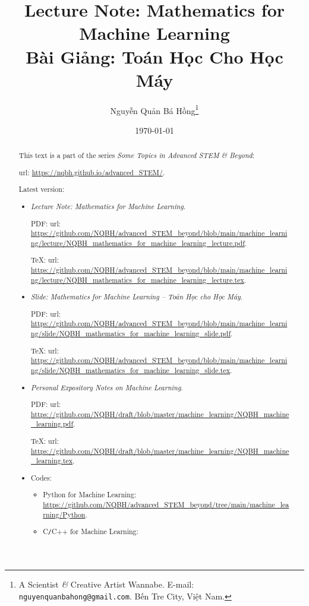\documentclass{article}
\title{Lecture Note: Mathematics for Machine Learning\\Bài Giảng: Toán Học Cho Học Máy}
\author{Nguyễn Quản Bá Hồng\footnote{A Scientist {\it\&} Creative Artist Wannabe. E-mail: {\tt nguyenquanbahong@gmail.com}. Bến Tre City, Việt Nam.}}
\date{\today}
\begin{document}
\maketitle
\begin{abstract}
	This text is a part of the series {\it Some Topics in Advanced STEM \& Beyond}:
	
	{\sc url}: \url{https://nqbh.github.io/advanced_STEM/}.
	
	Latest version:
	\begin{itemize}
		\item {\it Lecture Note: Mathematics for Machine Learning}.
		
		PDF: {\sc url}: \url{https://github.com/NQBH/advanced_STEM_beyond/blob/main/machine_learning/lecture/NQBH_mathematics_for_machine_learning_lecture.pdf}.
		
		\TeX: {\sc url}: \url{https://github.com/NQBH/advanced_STEM_beyond/blob/main/machine_learning/lecture/NQBH_mathematics_for_machine_learning_lecture.tex}.
		\item {\it Slide: Mathematics for Machine Learning -- Toán Học cho Học Máy}.
		
		PDF: {\sc url}: \url{https://github.com/NQBH/advanced_STEM_beyond/blob/main/machine_learning/slide/NQBH_mathematics_for_machine_learning_slide.pdf}.
		
		\TeX: {\sc url}: \url{https://github.com/NQBH/advanced_STEM_beyond/blob/main/machine_learning/slide/NQBH_mathematics_for_machine_learning_slide.tex}.
		\item {\it Personal Expository Notes on Machine Learning}.
		
		PDF: {\sc url}: \url{https://github.com/NQBH/draft/blob/master/machine_learning/NQBH_machine_learning.pdf}.
		
		\TeX: {\sc url}: \url{https://github.com/NQBH/draft/blob/master/machine_learning/NQBH_machine_learning.tex}.
		\item Codes:
		\begin{itemize}
			\item Python for Machine Learning: \url{https://github.com/NQBH/advanced_STEM_beyond/tree/main/machine_learning/Python}.
			\item C{\tt/}C++ for Machine Learning:
		\end{itemize}
	\end{itemize}
\end{abstract}
\tableofcontents

\end{document}
